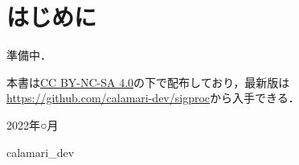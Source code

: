 \documentclass[../../main]{subfiles}
\begin{document}
\chapter{はじめに}
\thispagestyle{empty}
準備中．

本書は\href{https://creativecommons.org/licenses/by-nc-sa/4.0/deed.ja}{CC BY-NC-SA 4.0}の下で配布しており，最新版は\url{https://github.com/calamari-dev/sigproc}から入手できる．

\vspace{1\zh}
\begin{flushleft}
  \noindent\hspace{2\zw} 2022年○月
\end{flushleft}
\begin{flushright}
  calamari\_dev\hspace*{2\zw}
\end{flushright}
\end{document}
